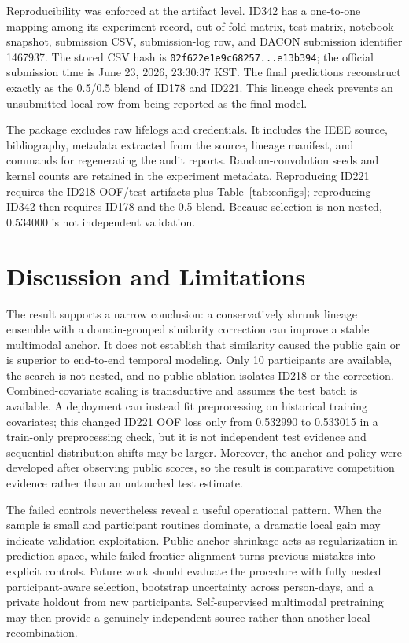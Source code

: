 \documentclass[conference]{IEEEtran}
\begin{document}
Reproducibility was enforced at the artifact level. ID342 has a one-to-one mapping among its experiment record, out-of-fold matrix, test matrix, notebook snapshot, submission CSV, submission-log row, and DACON submission identifier 1467937. The stored CSV hash is \texttt{02f622e1e9c68257...e13b394}; the official submission time is June 23, 2026, 23:30:37 KST. The final predictions reconstruct exactly as the 0.5/0.5 blend of ID178 and ID221. This lineage check prevents an unsubmitted local row from being reported as the final model.

The package excludes raw lifelogs and credentials. It includes the IEEE source, bibliography, metadata extracted from the source, lineage manifest, and commands for regenerating the audit reports. Random-convolution seeds and kernel counts are retained in the experiment metadata. Reproducing ID221 requires the ID218 OOF/test artifacts plus Table~\ref{tab:configs}; reproducing ID342 then requires ID178 and the 0.5 blend. Because selection is non-nested, 0.534000 is not independent validation.

\section{Discussion and Limitations}
The result supports a narrow conclusion: a conservatively shrunk lineage ensemble with a domain-grouped similarity correction can improve a stable multimodal anchor. It does not establish that similarity caused the public gain or is superior to end-to-end temporal modeling. Only 10 participants are available, the search is not nested, and no public ablation isolates ID218 or the correction. Combined-covariate scaling is transductive and assumes the test batch is available. A deployment can instead fit preprocessing on historical training covariates; this changed ID221 OOF loss only from 0.532990 to 0.533015 in a train-only preprocessing check, but it is not independent test evidence and sequential distribution shifts may be larger. Moreover, the anchor and policy were developed after observing public scores, so the result is comparative competition evidence rather than an untouched test estimate.

The failed controls nevertheless reveal a useful operational pattern. When the sample is small and participant routines dominate, a dramatic local gain may indicate validation exploitation. Public-anchor shrinkage acts as regularization in prediction space, while failed-frontier alignment turns previous mistakes into explicit controls. Future work should evaluate the procedure with fully nested participant-aware selection, bootstrap uncertainty across person-days, and a private holdout from new participants. Self-supervised multimodal pretraining may then provide a genuinely independent source rather than another local recombination.
\end{document}
